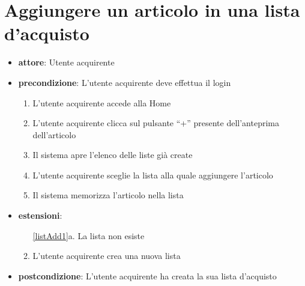 \section{Aggiungere un articolo in una lista d’acquisto}
\begin{itemize}
    \item \textbf{attore}: Utente acquirente
    \item \textbf{precondizione}: L’utente acquirente deve effettua il login

    \begin{enumerate}
        \item L’utente acquirente accede alla Home
        \item L’utente acquirente clicca sul pulsante “+” presente dell’anteprima dell’articolo
        \item Il sistema apre l’elenco delle liste già create
        \item L’utente acquirente sceglie la lista alla quale aggiungere l’articolo
        \label{listAdd1}
        \item Il sistema memorizza l’articolo nella lista
    \end{enumerate}

    \item \textbf{estensioni}:
    \begin{enumerate}
        \item[\ref{listAdd1}a.] La lista non esiste
        \item L’utente acquirente crea una nuova lista
    \end{enumerate}

    \item \textbf{postcondizione}:  L’utente acquirente ha creata la sua lista d’acquisto
\end{itemize}



